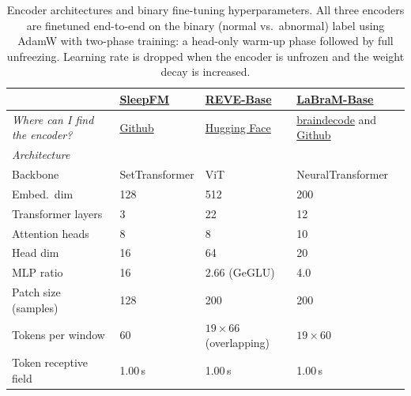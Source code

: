 \documentclass{article}
\begin{document}
\begin{table}[h]
\centering
\scriptsize
\caption{Encoder architectures and binary fine-tuning hyperparameters.
All three encoders are finetuned end-to-end on the binary
(normal vs.\ abnormal) label using AdamW with two-phase training:
a head-only warm-up phase followed by full unfreezing.
Learning rate is dropped when the encoder is unfrozen and the weight decay
is increased.}
\label{tab:encoder_hparams}
\setlength{\tabcolsep}{4pt}
\begin{tabular}{l p{2.8cm} p{3.2cm} p{2.8cm}}
\toprule
 & \href{https://www.nature.com/articles/s41591-025-04133-4}{SleepFM} & \href{https://arxiv.org/abs/2510.21585}{REVE-Base} & \href{https://arxiv.org/abs/2405.18765}{LaBraM-Base} \\
 \midrule
 \emph{Where can I find the encoder?}
  & \href{https://github.com/zou-group/sleepfm-clinical}{Github}
  & \href{https://huggingface.co/brain-bzh/reve-base}{Hugging Face}
  &  \href{https://braindecode.org/dev/generated/braindecode.models.Labram.html}{braindecode} and \href{https://github.com/935963004/LaBraM}{Github} \\
\midrule
\multicolumn{4}{l}{\emph{Architecture}} \\
Backbone
  & {SetTransformer}
  & {ViT}
  & {NeuralTransformer} \\
Embed.\ dim         & 128                & 512                & 200 \\
 Transformer layers      & 3                    & 22                                   & 12 \\                                                        
  Attention heads         & 8                    & 8                                    & 10 \\                                                        
  Head dim                & 16                   & 64                                   & 20 \\                                                        
  MLP ratio               & 16       & 2.66 (GeGLU)                         & 4.0 \\                                                       
  Patch size (samples)    & 128                  & 200                                  & 200 \\ 
Tokens per window       & 60                   & $19 \times 66$ (overlapping) & $19 \times 60$ \\
  Token receptive field   & 1.00\,s              & 1.00\,s                                    & 1.00\,s \\                                             

\end{tabular}
\end{table}
\end{document}
